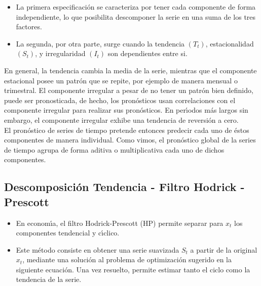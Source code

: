 \begin{itemize}
\item La primera especificaci\'on se caracteriza por tener cada componente de forma independiente, lo que posibilita descomponer la serie en una suma de los tres factores.
\item  La segunda, por otra parte, surge cuando la tendencia $(T_t)$, estacionalidad $(S_t)$, y irregularidad $(I_t)$ son dependientes entre si.
\end{itemize}



En general, la tendencia cambia la media de la serie, mientras que el componente estacional posee un patr\'on que se repite, por ejemplo de manera mensual o trimestral. El componente irregular a pesar de no tener un patr\'on bien definido, puede ser pronosticada, de hecho, los pron\'osticos usan correlaciones con el componente irregular para realizar sus pron\'osticos. En per\'\i{}odos m\'as largos sin embargo, el componente irregular exhibe una tendencia de reversi\'on a cero.\\
El pron\'ostico de series de tiempo pretende entonces predecir cada uno de \'estos componentes de manera individual. Como vimos, el pron\'ostico global de la series de tiempo agrupa de forma aditiva o multiplicativa cada uno de dichos componentes.

\subsection{Descomposici\'on Tendencia - Filtro Hodrick -Prescott}

\begin{itemize}
	\item En econom\'\i{}a, el filtro Hodrick-Prescott (HP) permite separar para $x_t$  los componentes tendencial y c\'\i{}clico.
	\item Este m\'etodo consiste en obtener una serie suavizada $S_t$ a partir de la original $x_t$, mediante una soluci\'on al problema de optimizaci\'on sugerido en la siguiente ecuaci\'on. Una vez resuelto, permite estimar tanto el ciclo como la tendencia de la serie.
\end{itemize}

